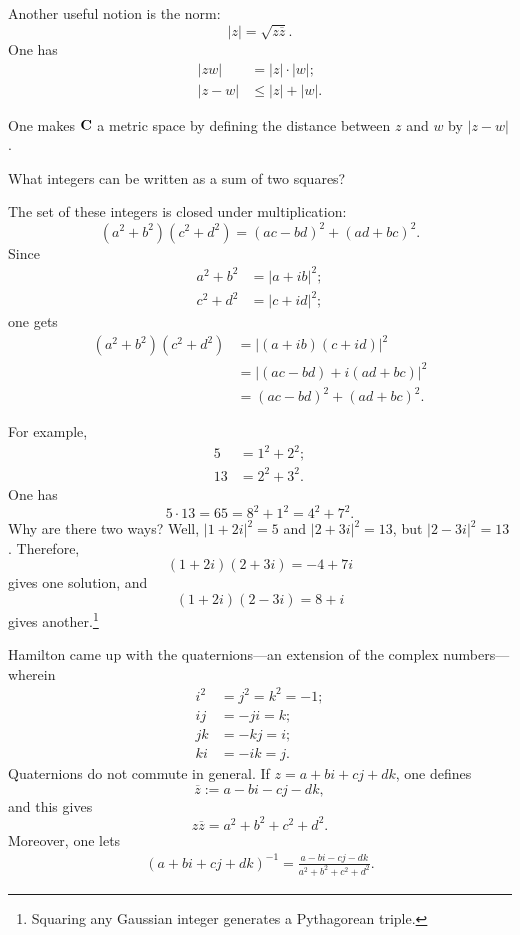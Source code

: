 \documentclass[11pt, oneside,margin=1in]{article}
\begin{document}
Another useful notion is the norm: 
\[
	\left\lvert z \right\rvert =\sqrt{z\overline{z}}.
\]
One has 
\begin{align*}
\left\lvert zw \right\rvert &= \left\lvert z \right\rvert \cdot \left\lvert w \right\rvert;\\
\left\lvert z-w \right\rvert &\le \left\lvert z \right\rvert +\left\lvert w \right\rvert .
\end{align*}

One makes $\mathbf C$ a metric space by defining the distance between $z$ and $w$ by $\left\lvert z-w \right\rvert $.

\begin{problem}
	What integers can be written as a sum of two squares?
\end{problem}

The set of these integers is closed under multiplication: 
\[
	(a^2+b^2) (c^2+d^2) =  (ac-bd) ^2 + (ad+bc) ^2.
\] 
Since 
\begin{align*}
a^2 + b^2 &= \left\lvert a+ib \right\rvert ^2;\\
c^2 + d^2 &= \left\lvert c+id \right\rvert ^2;
\end{align*}
one gets
\begin{align*}
	(a^2+b^2) (c^2+d^2)&=  \left\lvert (a+ib) (c+id) \right\rvert ^2\\
			   &= \left\lvert (ac-bd) + i (ad+bc) \right\rvert^2\\
			   &= (ac-bd) ^2 + (ad+bc)^2.
\end{align*}

For example, 
\begin{align*}
5&=1^2 + 2^2; \\
13&= 2^2 + 3^2.
\end{align*} 
One has 
\[
5\cdot 13 = 65 = 8^2 + 1^2 = 4^2 + 7^2.
\] 
Why are there two ways? Well, $\left\lvert 1+2i \right\rvert ^2 = 5$ and $\left\lvert 2+3i \right\rvert ^2 = 13$, but $\left\lvert 2-3i \right\rvert ^2 = 13$. Therefore,
\[
	(1+2i) (2+3i) = -4 + 7i
\] 
gives one solution, and 
\[
	(1+2i) (2-3i) = 8+i 
\]
gives another.\footnote{Squaring any Gaussian integer generates a Pythagorean triple.}

Hamilton came up with the quaternions---an extension of the complex numbers---wherein 
\begin{align*}
i^2 &= j^2 = k^2 = -1;\\
ij &= -ji = k;\\
jk &= -kj = i;\\
ki &= -ik = j.
\end{align*}
Quaternions do not commute in general. If $z = a+bi+cj+dk$, one defines
\[
	\overline{z} :=a-bi-cj-dk,
\] 
and this gives 
\[
	z\overline{z}=a^2 + b^2+c^2+d^2.
\] 
Moreover, one lets
\begin{align*}
	(a+bi+cj+dk) ^{-1} = \frac{a-bi-cj-dk}{a^2+b^2+c^2+d^2}.
\end{align*}
\end{document}
